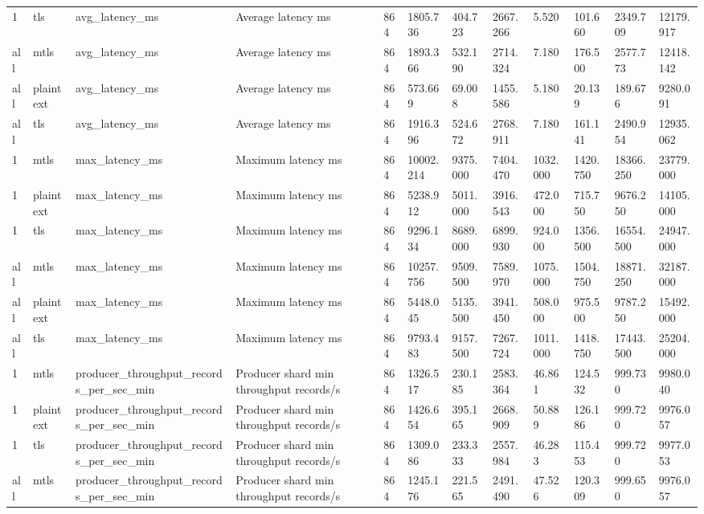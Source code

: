 \begin{longtable}{llllllllllll}
1 & tls & avg\_latency\_ms & Average latency ms & 864 & 1805.736 & 404.723 & 2667.266 & 5.520 & 101.660 & 2349.709 & 12179.917 \\
all & mtls & avg\_latency\_ms & Average latency ms & 864 & 1893.366 & 532.190 & 2714.324 & 7.180 & 176.500 & 2577.773 & 12418.142 \\
all & plaintext & avg\_latency\_ms & Average latency ms & 864 & 573.669 & 69.008 & 1455.586 & 5.180 & 20.139 & 189.676 & 9280.091 \\
all & tls & avg\_latency\_ms & Average latency ms & 864 & 1916.396 & 524.672 & 2768.911 & 7.180 & 161.141 & 2490.954 & 12935.062 \\
1 & mtls & max\_latency\_ms & Maximum latency ms & 864 & 10002.214 & 9375.000 & 7404.470 & 1032.000 & 1420.750 & 18366.250 & 23779.000 \\
1 & plaintext & max\_latency\_ms & Maximum latency ms & 864 & 5238.912 & 5011.000 & 3916.543 & 472.000 & 715.750 & 9676.250 & 14105.000 \\
1 & tls & max\_latency\_ms & Maximum latency ms & 864 & 9296.134 & 8689.000 & 6899.930 & 924.000 & 1356.500 & 16554.500 & 24947.000 \\
all & mtls & max\_latency\_ms & Maximum latency ms & 864 & 10257.756 & 9509.500 & 7589.970 & 1075.000 & 1504.750 & 18871.250 & 32187.000 \\
all & plaintext & max\_latency\_ms & Maximum latency ms & 864 & 5448.045 & 5135.500 & 3941.450 & 508.000 & 975.500 & 9787.250 & 15492.000 \\
all & tls & max\_latency\_ms & Maximum latency ms & 864 & 9793.483 & 9157.500 & 7267.724 & 1011.000 & 1418.750 & 17443.500 & 25204.000 \\
1 & mtls & producer\_throughput\_records\_per\_sec\_min & Producer shard min throughput records/s & 864 & 1326.517 & 230.185 & 2583.364 & 46.861 & 124.532 & 999.730 & 9980.040 \\
1 & plaintext & producer\_throughput\_records\_per\_sec\_min & Producer shard min throughput records/s & 864 & 1426.654 & 395.165 & 2668.909 & 50.889 & 126.186 & 999.720 & 9976.057 \\
1 & tls & producer\_throughput\_records\_per\_sec\_min & Producer shard min throughput records/s & 864 & 1309.086 & 233.333 & 2557.984 & 46.283 & 115.453 & 999.720 & 9977.053 \\
all & mtls & producer\_throughput\_records\_per\_sec\_min & Producer shard min throughput records/s & 864 & 1245.176 & 221.565 & 2491.490 & 47.526 & 120.309 & 999.650 & 9976.057 \\

\end{longtable}
